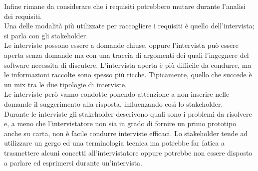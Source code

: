 Infine rimane da considerare che i requisiti potrebbero mutare durante l'analisi dei requisiti.\\
Una delle modalità più utilizzate per raccogliere i requisiti è quello dell'intervista; si parla con gli stakeholder.\\
Le interviste possono essere a domande chiuse, oppure l'intervista può essere aperta senza domande ma con una traccia di argomenti dei quali l'ingegnere del software necessita di discutere.
L'intervista aperta è più difficile da condurre, ma le informazioni raccolte sono spesso più ricche.
Tipicamente, quello che succede è un mix tra le due tipologie di interviste.\\
Le interviste però vanno condotte ponendo attenzione a non inserire nelle domande il suggerimento alla risposta, influenzando così lo stakeholder.\\
Durante le interviste gli stakeholder descrivono quali sono i problemi da risolvere e, a meno che l'intervistatore non sia in grado di fornire un primo prototipo anche su carta, non è facile condurre interviste efficaci.
Lo stakeholder tende ad utilizzare un gergo ed una terminologia tecnica ma potrebbe far fatica a trasmettere alcuni concetti all'intervistatore oppure potrebbe non essere disposto a parlare ed esprimersi durante un'intervista.\\

